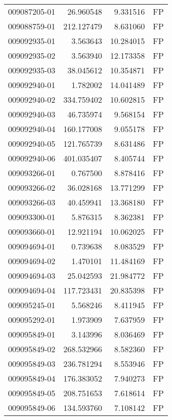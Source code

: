\begin{tabular}{lrrl}
009087205-01 &   26.960548 &       9.331516 &   FP \\
009088759-01 &  212.127479 &       8.631060 &   FP \\
009092935-01 &    3.563643 &      10.284015 &   FP \\
009092935-02 &    3.563940 &      12.173358 &   FP \\
009092935-03 &   38.045612 &      10.354871 &   FP \\
009092940-01 &    1.782002 &      14.041489 &   FP \\
009092940-02 &  334.759402 &      10.602815 &   FP \\
009092940-03 &   46.735974 &       9.568154 &   FP \\
009092940-04 &  160.177008 &       9.055178 &   FP \\
009092940-05 &  121.765739 &       8.631486 &   FP \\
009092940-06 &  401.035407 &       8.405744 &   FP \\
009093266-01 &    0.767500 &       8.878416 &   FP \\
009093266-02 &   36.028168 &      13.771299 &   FP \\
009093266-03 &   40.459941 &      13.368180 &   FP \\
009093300-01 &    5.876315 &       8.362381 &   FP \\
009093660-01 &   12.921194 &      10.062025 &   FP \\
009094694-01 &    0.739638 &       8.083529 &   FP \\
009094694-02 &    1.470101 &      11.484169 &   FP \\
009094694-03 &   25.042593 &      21.984772 &   FP \\
009094694-04 &  117.723431 &      20.835398 &   FP \\
009095245-01 &    5.568246 &       8.411945 &   FP \\
009095292-01 &    1.973909 &       7.637959 &   FP \\
009095849-01 &    3.143996 &       8.036469 &   FP \\
009095849-02 &  268.532966 &       8.582360 &   FP \\
009095849-03 &  236.781294 &       8.553946 &   FP \\
009095849-04 &  176.383052 &       7.940273 &   FP \\
009095849-05 &  208.751653 &       7.618614 &   FP \\
009095849-06 &  134.593760 &       7.108142 &   FP \\

\end{tabular}
